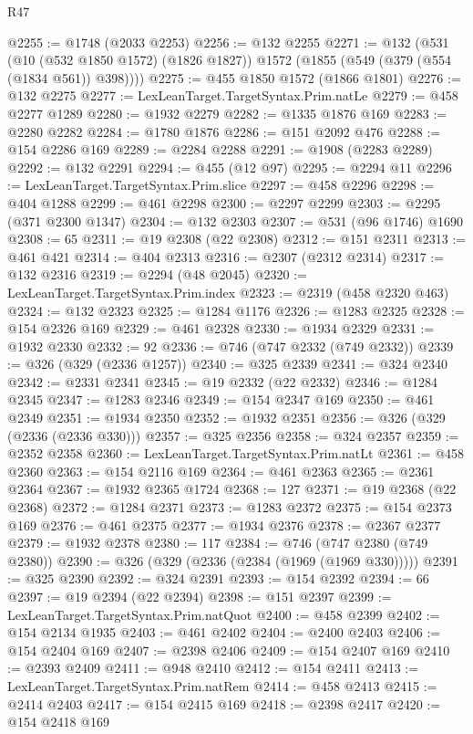 \begin{lexlean}{R47}
\begin{coremodule}
@2255 := @1748 (@2033 @2253)
@2256 := @132 @2255
@2271 := @132
    (@531
      (@10 (@532 @1850 @1572) (@1826 @1827))
      @1572
      (@1855 (@549 (@379 (@554 (@1834 @561)) @398))))
@2275 := @455 @1850 @1572 (@1866 @1801)
@2276 := @132 @2275
@2277 := LexLeanTarget.TargetSyntax.Prim.natLe
@2279 := @458 @2277 @1289
@2280 := @1932 @2279
@2282 := @1335 @1876 @169
@2283 := @2280 @2282
@2284 := @1780 @1876
@2286 := @151 @2092 @476
@2288 := @154 @2286 @169
@2289 := @2284 @2288
@2291 := @1908 (@2283 @2289)
@2292 := @132 @2291
@2294 := @455 (@12 @97)
@2295 := @2294 @11
@2296 := LexLeanTarget.TargetSyntax.Prim.slice
@2297 := @458 @2296
@2298 := @404 @1288
@2299 := @461 @2298
@2300 := @2297 @2299
@2303 := @2295 (@371 @2300 @1347)
@2304 := @132 @2303
@2307 := @531 (@96 @1746) @1690
@2308 := 65
@2311 := @19 @2308 (@22 @2308)
@2312 := @151 @2311
@2313 := @461 @421
@2314 := @404 @2313
@2316 := @2307 (@2312 @2314)
@2317 := @132 @2316
@2319 := @2294 (@48 @2045)
@2320 := LexLeanTarget.TargetSyntax.Prim.index
@2323 := @2319 (@458 @2320 @463)
@2324 := @132 @2323
@2325 := @1284 @1176
@2326 := @1283 @2325
@2328 := @154 @2326 @169
@2329 := @461 @2328
@2330 := @1934 @2329
@2331 := @1932 @2330
@2332 := 92
@2336 := @746 (@747 @2332 (@749 @2332))
@2339 := @326 (@329 (@2336 @1257))
@2340 := @325 @2339
@2341 := @324 @2340
@2342 := @2331 @2341
@2345 := @19 @2332 (@22 @2332)
@2346 := @1284 @2345
@2347 := @1283 @2346
@2349 := @154 @2347 @169
@2350 := @461 @2349
@2351 := @1934 @2350
@2352 := @1932 @2351
@2356 := @326 (@329 (@2336 (@2336 @330)))
@2357 := @325 @2356
@2358 := @324 @2357
@2359 := @2352 @2358
@2360 := LexLeanTarget.TargetSyntax.Prim.natLt
@2361 := @458 @2360
@2363 := @154 @2116 @169
@2364 := @461 @2363
@2365 := @2361 @2364
@2367 := @1932 @2365 @1724
@2368 := 127
@2371 := @19 @2368 (@22 @2368)
@2372 := @1284 @2371
@2373 := @1283 @2372
@2375 := @154 @2373 @169
@2376 := @461 @2375
@2377 := @1934 @2376
@2378 := @2367 @2377
@2379 := @1932 @2378
@2380 := 117
@2384 := @746 (@747 @2380 (@749 @2380))
@2390 := @326 (@329 (@2336 (@2384 (@1969 (@1969 @330)))))
@2391 := @325 @2390
@2392 := @324 @2391
@2393 := @154 @2392
@2394 := 66
@2397 := @19 @2394 (@22 @2394)
@2398 := @151 @2397
@2399 := LexLeanTarget.TargetSyntax.Prim.natQuot
@2400 := @458 @2399
@2402 := @154 @2134 @1935
@2403 := @461 @2402
@2404 := @2400 @2403
@2406 := @154 @2404 @169
@2407 := @2398 @2406
@2409 := @154 @2407 @169
@2410 := @2393 @2409
@2411 := @948 @2410
@2412 := @154 @2411
@2413 := LexLeanTarget.TargetSyntax.Prim.natRem
@2414 := @458 @2413
@2415 := @2414 @2403
@2417 := @154 @2415 @169
@2418 := @2398 @2417
@2420 := @154 @2418 @169

\end{coremodule}
\end{lexlean}
